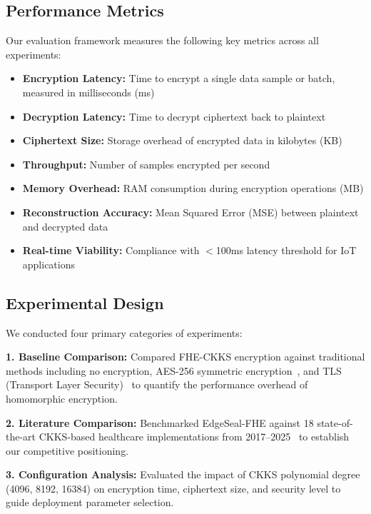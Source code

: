 \subsection{Performance Metrics}

Our evaluation framework measures the following key metrics across all experiments:

\begin{itemize}
    \item \textbf{Encryption Latency:} Time to encrypt a single data sample or batch, measured in milliseconds (ms)
    \item \textbf{Decryption Latency:} Time to decrypt ciphertext back to plaintext
    \item \textbf{Ciphertext Size:} Storage overhead of encrypted data in kilobytes (KB)
    \item \textbf{Throughput:} Number of samples encrypted per second
    \item \textbf{Memory Overhead:} RAM consumption during encryption operations (MB)
    \item \textbf{Reconstruction Accuracy:} Mean Squared Error (MSE) between plaintext and decrypted data
    \item \textbf{Real-time Viability:} Compliance with $<$100ms latency threshold for IoT applications~\cite{bonomi2012fog}
\end{itemize}

\subsection{Experimental Design}

We conducted four primary categories of experiments:

\textbf{1. Baseline Comparison:} Compared FHE-CKKS encryption against traditional methods including no encryption, AES-256 symmetric encryption~\cite{daemen2002design}, and TLS (Transport Layer Security)~\cite{rescorla2018transport} to quantify the performance overhead of homomorphic encryption.

\textbf{2. Literature Comparison:} Benchmarked EdgeSeal-FHE against 18 state-of-the-art CKKS-based healthcare implementations from 2017--2025~\cite{kim2018logistic, benaissa2021tenseal, lee2022efficient, cheon2017homomorphic} to establish our competitive positioning.

\textbf{3. Configuration Analysis:} Evaluated the impact of CKKS polynomial degree (4096, 8192, 16384) on encryption time, ciphertext size, and security level to guide deployment parameter selection.

